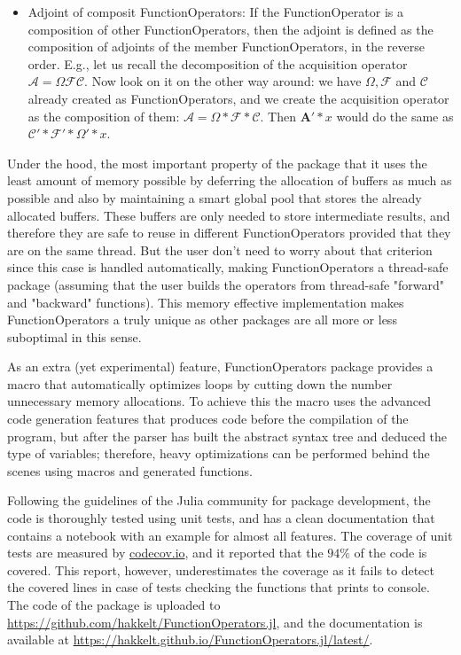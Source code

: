 \begin{itemize}
    \item Adjoint of composit FunctionOperators: If the FunctionOperator is a composition of other FunctionOperators, then the adjoint is defined as the composition of adjoints of the member FunctionOperators, in the reverse order. E.g., let us recall the decomposition of the acquisition operator $\mathcal{A} = \Omega \mathcal{FC}$. Now look on it on the other way around: we have $\Omega, \mathcal{F}$ and $\mathcal{C}$ already created as FunctionOperators, and we create the acquisition operator as the composition of them: $\mathcal{A} = \Omega * \mathcal{F * C}$. Then $\mathbf{A}' * x$ would do the same as $\mathcal{C' * F'} * \Omega' * x$.
\end{itemize}

Under the hood, the most important property of the package that it uses the least amount of memory possible by deferring the allocation of buffers as much as possible and also by maintaining a smart global pool that stores the already allocated buffers. These buffers are only needed to store intermediate results, and therefore they are safe to reuse in different FunctionOperators provided that they are on the same thread. But the user don't need to worry about that criterion since this case is handled automatically, making FunctionOperators a thread-safe package (assuming that the user builds the operators from thread-safe "forward" and "backward" functions). This memory effective implementation makes FunctionOperators a truly unique as other packages are all more or less suboptimal in this sense.

As an extra (yet experimental) feature, FunctionOperators package provides a macro that automatically optimizes loops by cutting down the number unnecessary memory allocations. To achieve this the macro uses the advanced code generation features that produces code before the compilation of the program, but after the parser has built the abstract syntax tree and deduced the type of variables; therefore, heavy optimizations can be performed behind the scenes using macros and generated functions. %

Following the guidelines of the Julia community for package development, the code is thoroughly tested using unit tests, and has a clean documentation that contains a notebook with an example for almost all features. The coverage of unit tests are measured by \url{codecov.io}, and it reported that the $94\%$ of the code is covered. This report, however, underestimates the coverage as it fails to detect the covered lines in case of tests checking the functions that prints to console. The code of the package is uploaded to \url{https://github.com/hakkelt/FunctionOperators.jl}, and the documentation is available at \url{https://hakkelt.github.io/FunctionOperators.jl/latest/}.

